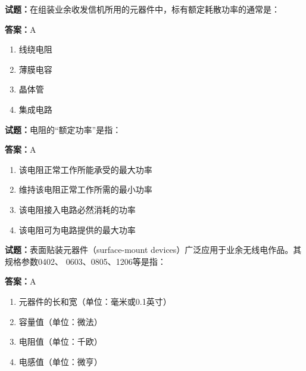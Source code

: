 \documentclass{ctexbook}
\begin{document}




\vspace{1em}

\textbf{试题：}在组装业余收发信机所用的元器件中，标有额定耗散功率的通常是： 

\textbf{答案：}A 

\begin{enumerate}[leftmargin=3em]
  \item 线绕电阻 

  \item 薄膜电容 

  \item 晶体管 

  \item 集成电路 


\end{enumerate}





\vspace{1em}

\textbf{试题：}电阻的“额定功率”是指： 

\textbf{答案：}A 

\begin{enumerate}[leftmargin=3em]
  \item 该电阻正常工作所能承受的最大功率 

  \item 维持该电阻正常工作所需的最小功率 

  \item 该电阻接入电路必然消耗的功率 

  \item 该电阻可为电路提供的最大功率 

\end{enumerate}





\vspace{1em}

\textbf{试题：}表面贴装元器件（surface-mount devices）广泛应用于业余无线电作品。其规格参数0402、
0603、0805、1206等是指： 

\textbf{答案：}A 

\begin{enumerate}[leftmargin=3em]
  \item 元器件的长和宽（单位：毫米或0.1英寸） 

  \item 容量值（单位：微法） 

  \item 电阻值（单位：千欧） 

  \item 电感值（单位：微亨） 

\end{enumerate}
\end{document}
